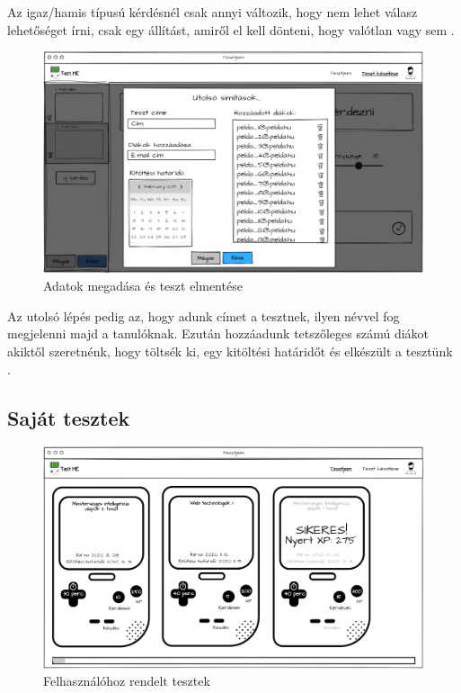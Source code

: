 Az igaz/hamis típusú kérdésnél csak annyi változik, hogy nem lehet válasz lehetőséget írni, csak egy állítást, amiről el kell dönteni, hogy valótlan vagy sem .

\begin{figure}[H]
    \centering
    \includegraphics[width=\linewidth]{images/make_test4_wireframe.png}
    \caption{Adatok megadása és teszt elmentése}
    \label{fig:save_test}
\end{figure}

Az utolsó lépés pedig az, hogy adunk címet a tesztnek, ilyen névvel fog megjelenni majd a tanulóknak. Ezután hozzáadunk tetszőleges számú diákot akiktől szeretnénk, hogy töltsék ki, egy kitöltési határidőt és elkészült a tesztünk .

\subsection{Saját tesztek}
\begin{figure}[H]
    \centering
    \includegraphics[width=\linewidth]{images/my_tests_wireframe.png}
    \caption{Felhasználóhoz rendelt tesztek}
    \label{fig:my_tests}
\end{figure}

